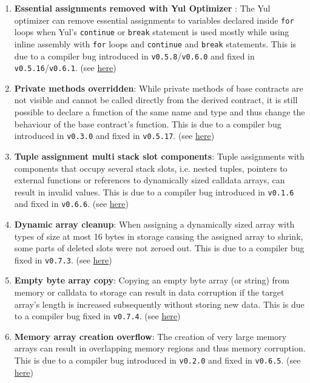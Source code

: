 \begin{enumerate}
\item\textbf{Essential assignments removed with Yul Optimizer} : The Yul optimizer can remove essential assignments to variables declared inside \verb|for| loops when Yul's \verb|continue| or \verb|break| statement is used mostly while using inline assembly with \verb|for| loops and \verb|continue| and \verb|break| statements. This is due to a compiler bug introduced in \verb|v0.5.8|/\verb|v0.6.0| and fixed in \verb|v0.5.16|/\verb|v0.6.1|. (see \href{https://docs.soliditylang.org/en/v0.8.9/bugs.html}{here})

\item\textbf{Private methods overridden}: While private methods of base contracts are not visible and cannot be called directly from the derived contract, it is still possible to declare a function of the same name and type and thus change the behaviour of the base contract's function. This is due to a compiler bug introduced in \verb|v0.3.0| and fixed in \verb|v0.5.17|. (see \href{https://docs.soliditylang.org/en/v0.8.9/bugs.html}{here})

\item\textbf{Tuple assignment multi stack slot components}: Tuple assignments with components that occupy several stack slots, i.e. nested tuples, pointers to external functions or references to dynamically sized calldata arrays, can result in invalid values. This is due to a compiler bug introduced in \verb|v0.1.6| and fixed in \verb|v0.6.6|. (see \href{https://docs.soliditylang.org/en/v0.8.9/bugs.html}{here})

\item\textbf{Dynamic array cleanup}: When assigning a dynamically sized array with types of size at most 16 bytes in storage causing the assigned array to shrink, some parts of deleted slots were not zeroed out. This is due to a compiler bug fixed in \verb|v0.7.3|. (see \href{https://docs.soliditylang.org/en/v0.8.9/bugs.html}{here})

\item\textbf{Empty byte array copy}: Copying an empty byte array (or string) from memory or calldata to storage can result in data corruption if the target array's length is increased subsequently without storing new data. This is due to a compiler bug fixed in \verb|v0.7.4|. (see \href{https://docs.soliditylang.org/en/v0.8.9/bugs.html}{here})

\item\textbf{Memory array creation overflow}: The creation of very large memory arrays can result in overlapping memory regions and thus memory corruption. This is due to a compiler bug introduced in \verb|v0.2.0| and fixed in \verb|v0.6.5|. (see \href{https://solidity.ethereum.org/2020/04/06/memory-creation-overflow-bug/}{here})


\end{enumerate}
